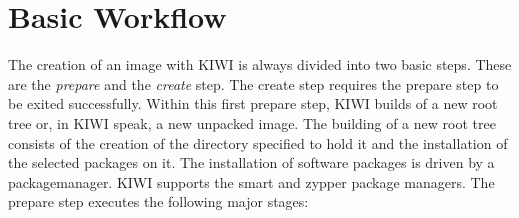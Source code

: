 \chapter{Basic Workflow}
\label{chapter:workflow}
\minitoc

The creation of an image with KIWI is always divided into two
basic steps. These are the \emph{prepare} and the \emph{create}
step. The create step requires the prepare step to be exited
successfully. Within this first prepare step, KIWI builds of a new root
tree or, in KIWI speak, a new unpacked image. The building of a new
root tree consists of the creation of the directory specified to
hold it and the installation of the selected packages on it. The
installation of software packages is driven by a packagemanager.
KIWI supports the smart
and zypper package managers. The prepare
step executes the following major stages:

